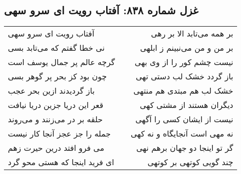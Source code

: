 \begin{center}
\section*{غزل شماره ۸۳۸: آفتاب رویت ای سرو سهی}
\label{sec:838}
\begin{longtable}{l p{0.5cm} r}
آفتاب رویت ای سرو سهی
&&
بر همه می‌تابد الا بر رهی
\\
نی خطا گفتم که می‌تابد بسی
&&
بر من و من می‌نبینم ز ابلهی
\\
گرچه عالم پر جمال یوسف است
&&
نیست چشم کور را از وی بهی
\\
چون بود کز بحر پر گوهر بسی
&&
باز گردد خشک لب دستی تهی
\\
باز گردیدند ازین بحر عجب
&&
خشک لب هم مبتدی هم منتهی
\\
قعر این دریا جزین دریا نیافت
&&
دیگران هستند از مشتی کهی
\\
حلقه بر در می‌زنند و می‌روند
&&
نیست از ایشان کسی را آگهی
\\
جمله را جز عجز آنجا کار نیست
&&
نه مهی است آنجایگاه و نه کهی
\\
می فرو افتد درین حیرت زهم
&&
گر تو اینجا دو جهان برهم نهی
\\
ای فرید اینجا که هستی محو گرد
&&
چند گویی کوتهی بر کوتهی
\\
\end{longtable}
\end{center}
